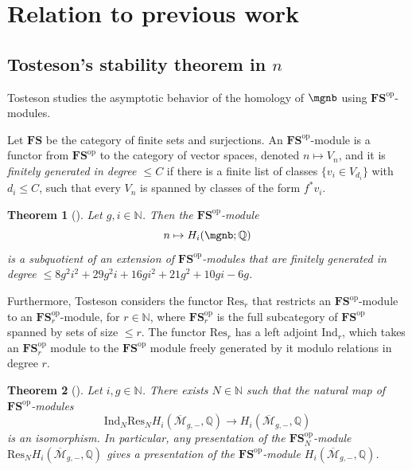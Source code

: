 \documentclass[12pt]{amsart}
\newtheorem{theorem}{Theorem}[section]
\theoremstyle{remark}
\theoremstyle{definition}
\numberwithin{equation}{section}
\begin{document}
\section{Relation to previous work}
\label{others work}

\subsection{Tosteson's stability theorem in $n$}

Tosteson \cite{tosteson2021stability} studies the asymptotic behavior of the homology of $\mgnb$ using $\mathbf{FS}^\text{op}$-modules.

Let $\mathbf{FS}$ be the category of finite sets and surjections. An $\mathbf{FS}^\text{op}$-module is a functor from $\mathbf{FS}^\text{op}$ to the category of vector spaces, denoted $n\mapsto V_n$, and it is \emph{finitely generated in degree $\le C$} if there is a finite list of classes $\{v_i\in V_{d_i}\}$ with $d_i\le C$, such that every $V_n$ is spanned by classes of the form $f^*v_i$.


\begin{theorem}[\cite{tosteson2021stability}]
    Let $g,i\in\mathbb N$. Then the $\mathbf{FS}^\text{op}$-module
    \[
    n\mapsto H_i(\mgnb;\mathbb Q)
    \]
    is a subquotient of an extension of $\mathbf{FS}^\text{op}$-modules that are finitely generated in degree $\le 8g^2i^2+29g^2i+16gi^2+21g^2+10gi-6g$.
\end{theorem}



Furthermore, Tosteson considers the functor $\text{Res}_r$ that restricts an $\mathbf{FS}^\text{op}$-module to an $\mathbf{FS}_r^\text{op}$-module, for $r\in\mathbb N$, where $\mathbf{FS}_r^\text{op}$ is the full subcategory of $\mathbf{FS}^\text{op}$ spanned by sets of size $\le r$. The functor $\text{Res}_r$ has a left adjoint $\text{Ind}_r$, which takes an $\mathbf{FS}_r^\text{op}$ module to the $\mathbf{FS}^\text{op}$ module freely generated by it modulo relations in degree $r$.


\begin{theorem}[\cite{tosteson2021stability}]
    Let $i, g\in\mathbb N$. There exists $N\in\mathbb N$ such that the natural map of $\mathbf{FS}^\text{op}$-modules
    \[
    \text{Ind}_N \text{Res}_N H_i(\overline{\mathcal M}_{g,-}, \mathbb Q) \to H_i(\overline{\mathcal M}_{g,-}, \mathbb Q)
    \]
    is an isomorphism. In particular, any presentation of the $\mathbf{FS}_N^\text{op}$-module $\text{Res}_N H_i(\overline{\mathcal M}_{g,-}, \mathbb Q)$ gives a presentation of the $\mathbf{FS}^\text{op}$-module $H_i(\overline{\mathcal M}_{g,-}, \mathbb Q)$.
\end{theorem}
\end{document}
